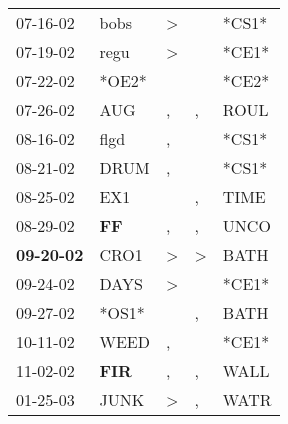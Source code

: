 \begin{supertabular}{p{0.07\textwidth}p{0.06\textwidth}p{0.02\textwidth}p{0.02\textwidth}p{0.06\textwidth}}
          07-16-02\textsuperscript{} &           bobs\textsuperscript{} &     \textgreater &                  &                            *CS1* \\
          07-19-02\textsuperscript{} &           regu\textsuperscript{} &     \textgreater &                  &                            *CE1* \\
          07-22-02\textsuperscript{} &                            *OE2* &                  &                  &                            *CE2* \\
          07-26-02\textsuperscript{} &            AUG\textsuperscript{} &                , &                , &           ROUL\textsuperscript{} \\
          08-16-02\textsuperscript{} &           flgd\textsuperscript{} &                , &                  &                            *CS1* \\
          08-21-02\textsuperscript{} &           DRUM\textsuperscript{} &                , &                  &                            *CS1* \\
          08-25-02\textsuperscript{} &            EX1\textsuperscript{} &                  &                , &           TIME\textsuperscript{} \\
          08-29-02\textsuperscript{} &    \textbf{FF\textsuperscript{}} &                , &                , &           UNCO\textsuperscript{} \\
 \textbf{09-20-02\textsuperscript{}} &           CRO1\textsuperscript{} &     \textgreater &     \textgreater &           BATH\textsuperscript{} \\
          09-24-02\textsuperscript{} &           DAYS\textsuperscript{} &     \textgreater &                  &                            *CE1* \\
          09-27-02\textsuperscript{} &                            *OS1* &                  &                , &           BATH\textsuperscript{} \\
          10-11-02\textsuperscript{} &           WEED\textsuperscript{} &                , &                  &                            *CE1* \\
          11-02-02\textsuperscript{} &   \textbf{FIR\textsuperscript{}} &                , &                , &           WALL\textsuperscript{} \\
          01-25-03\textsuperscript{} &           JUNK\textsuperscript{} &     \textgreater &                , &           WATR\textsuperscript{} \\

\end{supertabular}
